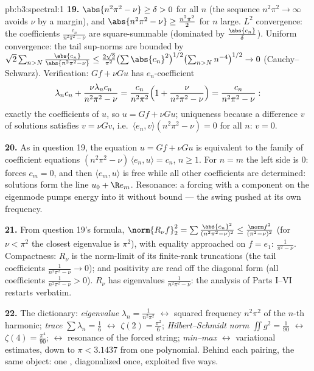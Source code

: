 \begin{solution}{pb:b3:spectral:1}
\textbf{19.} $\abs{n^2\pi^2 - \nu} \geq \delta > 0$ for all
$n$ (the sequence $n^2\pi^2 \to \infty$ avoids $\nu$ by a
margin), and $\abs{n^2\pi^2 - \nu} \geq \frac{n^2\pi^2}2$
for $n$ large. $L^2$ convergence: the coefficients
$\frac{c_n}{n^2\pi^2 - \nu}$ are square-summable (dominated
by $\frac{\abs{c_n}}\delta$). Uniform convergence: the tail
sup-norms are bounded by $\sqrt2\sum_{n>N}
\frac{\abs{c_n}}{\abs{n^2\pi^2 - \nu}} \leq
\frac{2\sqrt2}{\pi^2}\bigl(\sum\abs{c_n}^2\bigr)^{1/2}
\bigl(\sum_{n>N}n^{-4}\bigr)^{1/2} \to 0$ (Cauchy--Schwarz).
Verification: $Gf + \nu Gu$ has $e_n$-coefficient
\[
\lambda_nc_n + \frac{\nu\lambda_nc_n}{n^2\pi^2 - \nu}
= \frac{c_n}{n^2\pi^2}\Bigl(1 + \frac{\nu}{n^2\pi^2 -
\nu}\Bigr) = \frac{c_n}{n^2\pi^2 - \nu} :
\]
exactly the
coefficients of $u$, so $u = Gf + \nu Gu$; uniqueness
because a difference $v$ of solutions satisfies $v = \nu
Gv$, i.e.\ $\langle e_n, v\rangle(n^2\pi^2 - \nu) = 0$ for
all $n$: $v = 0$.

\textbf{20.} As in question 19, the equation $u = Gf + \nu
Gu$ is equivalent to the family of coefficient equations
$(n^2\pi^2 - \nu)\,\langle e_n, u\rangle = c_n$, $n \geq
1$. For $n = m$ the left side is
$0$:  forces $c_m = 0$, and then $\langle e_m,
u\rangle$ is free while all other coefficients are
determined: solutions form the line $u_0 + \R e_m$.
Resonance: a forcing with a component on the eigenmode
pumps energy into it without bound --- the swing pushed at
its own frequency.

\textbf{21.} From question 19's formula, $\norm{R_\nu f}_2^2
= \sum\frac{\abs{c_n}^2}{(n^2\pi^2 - \nu)^2} \leq
\frac{\norm f^2}{(\pi^2 - \nu)^2}$ (for $\nu < \pi^2$ the
closest eigenvalue is $\pi^2$), with equality approached on
$f = e_1$:  $\frac1{\pi^2 - \nu}$. Compactness:
$R_\nu$ is the norm-limit of its finite-rank truncations
(the tail coefficients $\frac1{n^2\pi^2 - \nu} \to 0$);
 and positivity are read off the diagonal
form (all coefficients $\frac1{n^2\pi^2 - \nu} > 0$).
$R_\nu$ has eigenvalues $\frac1{n^2\pi^2 - \nu}$: the
analysis of Parts I--VI restarts verbatim.

\textbf{22.} The dictionary: \emph{eigenvalue} $\lambda_n =
\frac1{n^2\pi^2}$ $\leftrightarrow$ squared frequency
$n^2\pi^2$ of the $n$-th harmonic; \emph{trace} $\sum
\lambda_n = \frac16$ $\leftrightarrow$ $\zeta(2) =
\frac{\pi^2}6$; \emph{Hilbert--Schmidt norm} $\iint g^2 =
\frac1{90}$ $\leftrightarrow$ $\zeta(4) = \frac{\pi^4}{90}$;
\emph{} $\leftrightarrow$ resonance of
the forced string; \emph{min--max} $\leftrightarrow$
variational estimates, down to $\pi < 3.1437$ from one
polynomial. Behind each pairing, the same object: one
 , diagonalized once, exploited
five ways.


\end{solution}

